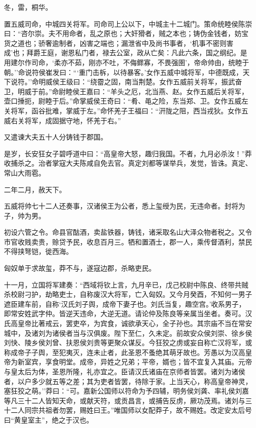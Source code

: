 \documentclass[]{article}
\begin{document}
冬，雷，桐华。

置五威司命，中城四关将军。司命司上公以下，中城主十二城门。策命统睦侯陈崇曰：``咨尔崇。夫不用命者，乱之原也；大奸猾者，贼之本也；铸伪金钱者，妨宝货之道也；骄奢逾制者，凶害之端也；漏泄省中及尚书事者，`机事不密则害成'也；拜爵王庭，谢恩私门者，禄去公室，政从亡矣：凡此六条，国之纲纪。是用建尔作司命，`柔亦不茹，刚亦不吐，不侮鳏寡，不畏强圉'，帝命帅由，统睦于朝。''命说符侯崔发曰：```重门击柝，以待暴客。'女作五威中城将军，中德既成，天下说符。''命明威侯王级曰：``绕霤之固，南当荆楚。女作五威前关将军，振武奋卫，明威于前。''命尉睦侯王嘉曰：``羊头之厄，北当燕、赵。女作五威后关将军，壶口捶扼，尉睦于后。''命掌威侯王奇曰：``肴、黾之险，东当郑、卫。女作五威左关将军，函谷批难，掌威于左。''命怀羌子王福曰：``汧陇之阻，西当戎狄。女作五威右关将军，成固据守地，怀羌于右。''

又遣谏大夫五十人分铸钱于郡国。

是岁，长安狂女子碧呼道中曰：``高皇帝大怒，趣归我国。不者，九月必杀汝！''莽收捕杀之。治者掌寇大夫陈咸自免去官。真定刘都等谋举兵，发觉，皆诛。真定、常山大雨雹。

二年二月，赦天下。

五威将帅七十二人还奏事，汉诸侯王为公者，悉上玺绶为民，无违命者。封将为子，帅为男。

初设六管之令。命县官酤酒，卖盐铁器，铸钱，诸采取名山大泽众物者税之。又令市官收贱卖贵，赊贷予民，收息百月三。牺和置酒士，郡一人，乘传督酒利，禁民不得挟弩铠，徙西海。

匈奴单于求故玺，莽不与，遂寇边郡，杀略吏民。

十一月，立国将军建奏：``西域将钦上言，九月辛已，戊己校尉中陈良、终带共贼杀校尉刁护，劫略吏士，自称废汉大将军，亡入匈奴。又今月癸酉，不知何一男子遮臣建车前，自称`汉氏刘子舆，成帝下妻子也。刘氏当复，趣空宫。'收系男子，即常安姓武字仲。皆逆天违命，大逆无道。请论仲及陈良等亲属当坐者。奏可。汉氏高皇帝比著戒云，罢吏卒，为宾食，诚欲承天心，全子孙也。其宗庙不当在常安城中，及诸刘为诸侯者当与汉俱废。陛下至仁，久未定。前故安众侯刘崇、徐乡侯刘快、陵乡侯刘曾、扶恩侯刘贵等更聚众谋反。今狂狡之虏或妄自称亡汉将军，或称成帝子子舆，至犯夷灭，连未止者，此圣恩不蚤绝其萌牙故也。芳愚以为汉高皇帝为新室宾，享食明堂。成帝，异姓之兄弟；平帝，婿也；皆不宜复入其庙。元帝与皇太后为体，圣恩所隆，礼亦宜之。臣请汉氏诸庙在京师者皆罢。诸刘为诸侯者，以户多少就五等之差；其为吏者皆罢，待除于家。上当天心，称高皇帝神灵，塞狂狡之萌。''莽曰：``可。嘉新公国师以符命为予四辅，明务侯刘龚、率礼侯刘嘉等凡三十二人皆知天命，或献天符，或贡昌言，或捕告反虏，厥功茂焉。诸刘与三十二人同宗共祖者勿罢，赐姓曰王。''唯国师以女配莽子，故不赐姓。改定安太后号曰``黄皇室主''，绝之于汉也。
\end{document}
